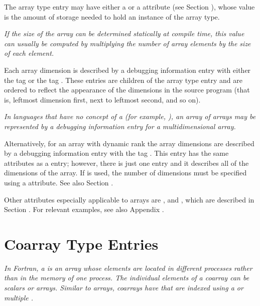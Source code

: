 The array type entry may have either a \DWATbytesize{} or a
\DWATbitsize{} attribute 
(see Section ), 
whose value is the
amount of storage needed to hold an instance of the array type.

\textit{If the size of the array can be determined statically at
compile time, this value can usually be computed by multiplying
the number of array elements by the size of each element.}


Each array dimension is described by a debugging information
entry with either the 
tag \DWTAGsubrangetype{} or the 
tag
\DWTAGenumerationtype. These entries are
children of the
array type entry and are ordered to reflect the appearance of
the dimensions in the source program (that is, leftmost dimension
first, next to leftmost second, and so on).

\textit{In languages that have no concept of a 
 (for example, 
), an array of arrays may
be represented by a debugging information entry for a
multidimensional array.}

Alternatively, for an array with dynamic rank the array dimensions 
are described by a debugging information entry with the tag
\DWTAGgenericsubrangeTARG.
This entry has the same attributes as a
\DWTAGsubrangetype{} entry; however,
there is just one \DWTAGgenericsubrangeNAME{} entry and it describes all of the
dimensions of the array.
If \DWTAGgenericsubrangeNAME{}
is used, the number of dimensions must be specified using a
\DWATrank{} attribute. See also Section
.

Other attributes especially applicable to arrays are
\DWATallocated, 
\DWATassociated{} and 
\DWATdatalocation,
which are described in 
Section . 
For relevant examples, see also Appendix .

\section{Coarray Type Entries}
\label{chap:coarraytypeentries}
\textit{In Fortran, a  is an array whose
elements are located in different processes rather than in the
memory of one process. The individual elements
of a coarray can be scalars or arrays.
Similar to arrays, coarrays have  that are 
indexed using a  or multiple .
}

